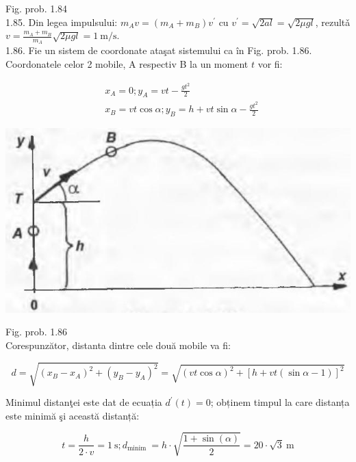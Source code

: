 \documentclass[10pt]{article}
\begin{document}
Fig. prob. 1.84\\
1.85. Din legea impulsului: $m_{A} v=\left(m_{A}+m_{B}\right) v^{\prime}$ cu $v^{\prime}=\sqrt{2 a l}=\sqrt{2 \mu g l}$, rezultǎ $v=\frac{m_{A}+m_{B}}{m_{A}} \sqrt{2 \mu g l}=1 \mathrm{~m} / \mathrm{s}$.\\
1.86. Fie un sistem de coordonate ataşat sistemului ca în Fig. prob. 1.86. Coordonatele celor 2 mobile, A respectiv B la un moment $t$ vor fi:

$$
\begin{aligned}
& x_{A}=0 ; y_{A}=v t-\frac{g t^{2}}{2} \\
& x_{B}=v t \cos \alpha ; y_{B}=h+v t \sin \alpha-\frac{g t^{2}}{2}
\end{aligned}
$$

\begin{center}
\includegraphics[max width=\textwidth]{2025_07_01_5b3ff9fa0d508c8e9f17g-214(1)}
\end{center}

Fig. prob. 1.86\\
Corespunzător, distanta dintre cele două mobile va fi:

$$
d=\sqrt{\left(x_{B}-x_{A}\right)^{2}+\left(y_{B}-y_{A}\right)^{2}}=\sqrt{(v t \cos \alpha)^{2}+[h+v t(\sin \alpha-1)]^{2}}
$$

Minimul distanţei este dat de ecuația $d^{\prime}(t)=0$; obținem timpul la care distanța este minimă şi această distanță:

$$
t=\frac{h}{2 \cdot v}=1 \mathrm{~s} ; d_{\text {minim }}=h \cdot \sqrt{\frac{1+\sin (\alpha)}{2}}=20 \cdot \sqrt{3} \mathrm{~m}
$$
\end{document}
